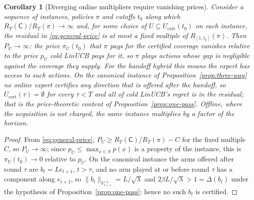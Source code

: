 \documentclass{article}
\newtheorem{corollary}{Corollary}
\theoremstyle{definition}
\theoremstyle{remark}
\theoremstyle{remark}
\newcommand{\Cold}{\mathsf{C}}
\begin{document}
\begin{corollary}[Diverging online multipliers require vanishing prices]
\label{cor:diverge}
Consider a sequence of instances, policies $\pi$ and cutoffs $t_0$ along
which $R_T(\Cold)/R_T(\pi)\to\infty$ and, for some choice of
$U\subseteq U_{\mathrm{cert}}(t_0)$ on each instance, the residual in
\eqref{eq:general-price} is at most a fixed multiple of $R_{[1,t_0]}(\pi)$.
Then $P_U\to\infty$: the price $\pi_U(t_0)$ that $\pi$ pays for the certified
coverage vanishes relative to the price $p_U$ cold LinUCB pays for it, so
$\pi$ plays actions whose gap is negligible against the coverage they supply.
For the handoff hybrid this means the expert has access to such actions.
On the canonical instance of Proposition~\ref{prop:three-way} no online expert
certifies any direction that is offered after the handoff, so
$U_{\mathrm{cert}}(\tau)=\emptyset$ for every $\tau<T$ and all of cold LinUCB's
regret is in the residual; that is the price-theoretic content of
Proposition~\ref{prop:one-pass}. Offline, where the acquisition is not
charged, the same instance multiplies by a factor of the horizon.
\end{corollary}

\begin{proof}
From \eqref{eq:general-price}, $P_U\ge R_T(\Cold)/R_T(\pi)-C$ for the
fixed multiple $C$, so $P_U\to\infty$; since $p_U\le\max_{x\in S}p(x)$ is a
property of the instance, this is $\pi_U(t_0)\to0$ relative to $p_U$.
On the canonical instance the arms offered after round $\tau$ are
$b_t=Le_{t+1}$, $t>\tau$, and no arm played at or before round $\tau$ has a
component along $e_{t+1}$, so $\|b_t\|_{V_{\tau+1}^{-1}}=L/\sqrt\lambda$ and
$2\beta L/\sqrt\lambda>1=\Delta(b_t)$ under the hypothesis of
Proposition~\ref{prop:one-pass}; hence no such $b_t$ is certified.
\end{proof}
\end{document}
